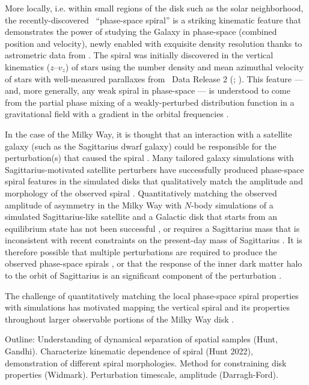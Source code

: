 More locally, i.e. within small regions of the disk such as the solar neighborhood, the recently-discovered \gaia\ ``phase-space spiral'' is a striking kinematic feature that demonstrates the power of studying the Galaxy in phase-space (combined position and velocity), newly enabled with exquisite density resolution thanks to astrometric data from \gaia.
The spiral was initially discovered in the vertical kinematics ($z$--$v_z$) of stars using the number density and mean azimuthal velocity of stars with well-measured parallaxes from \gaia\ Data Release 2 (; \citealt{Antoja:2018}).
This feature --- and, more generally, any weak spiral in phase-space --- is understood to come from the partial phase mixing of a weakly-perturbed distribution function in a gravitational field with a gradient in the orbital frequencies \citep[e.g.,][]{Tremaine:1999, Binney:2018}.

In the case of the Milky Way, it is thought that an interaction with a satellite galaxy (such as the Sagittarius dwarf galaxy) could be responsible for the perturbation(s) that caused the spiral \citep[e.g.,][]{Antoja:2018, Laporte:2019, Darling:2019}.
Many tailored galaxy simulations with Sagittarius-motivated satellite perturbers have successfully produced phase-space spiral features in the simulated disks that qualitatively match the amplitude and morphology of the observed spiral \citep{Khanna:2019, Laporte:2019, Bland-Hawthorn:2021, Hunt:2021, Gandhi:2022}.
Quantitatively matching the observed amplitude of asymmetry in the Milky Way with $N$-body simulations of a simulated Sagittarius-like satellite and a Galactic disk that starts from an equilibrium state has not been successful \citep{Bennett:2022}, or requires a Sagittarius mass that is inconsistent with recent constraints on the present-day mass of Sagittarius \citep{Vasiliev:XX}.
It is therefore possible that multiple perturbations are required to produce the observed phase-space spirals \citep[e.g.,][]{Garcia-Conde:2022}, or that the response of the inner dark matter halo to the orbit of Sagittarius is an significant component of the perturbation \citep{Grand:2022}.


The challenge of quantitatively matching the local phase-space spiral properties with simulations has motivated mapping the vertical spiral and its properties throughout larger observable portions of the Milky Way disk \citep[e.g.,][]{XX}. %

Outline: Understanding of dynamical separation of spatial samples (Hunt, Gandhi). Characterize kinematic dependence of spiral (Hunt 2022), demonstration of different spiral morphologies. Method for constraining disk properties (Widmark). Perturbation timescale, amplitude (Darragh-Ford).

